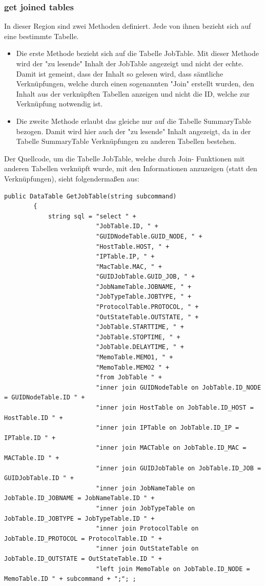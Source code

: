 \documentclass[12pt,a4paper]{report}
\begin{document}
\begin{onehalfspace}
\subsubsection{get joined tables}
In dieser Region sind zwei Methoden definiert. Jede von ihnen bezieht sich auf eine bestimmte Tabelle.
\begin{itemize}
\item Die erste Methode bezieht sich auf die Tabelle JobTable. Mit dieser Methode wird der "{}zu lesende"{} Inhalt der JobTable angezeigt und nicht der echte. Damit ist gemeint, dass der Inhalt so gelesen wird, dass sämtliche Verknüpfungen, welche durch einen sogenannten "{}Join"{} erstellt wurden, den Inhalt aus der verknüpften Tabellen anzeigen und nicht die ID, welche zur Verknüpfung notwendig ist.
\item Die zweite Methode erlaubt das gleiche nur auf die Tabelle SummaryTable bezogen. Damit wird hier auch der "{}zu lesende"{} Inhalt angezeigt, da in der Tabelle SummaryTable Verknüpfungen zu anderen Tabellen bestehen.
\end{itemize}
Der Quellcode, um die Tabelle JobTable, welche durch Join- Funktionen mit anderen Tabellen verknüpft wurde, mit den Informationen anzuzeigen (statt den Verknüpfungen), sieht folgendermaßen aus:
\begin{lstlisting}
public DataTable GetJobTable(string subcommand)
        {
            string sql = "select " +
                         "JobTable.ID, " +
                         "GUIDNodeTable.GUID_NODE, " +
                         "HostTable.HOST, " +
                         "IPTable.IP, " +
                         "MacTable.MAC, " +
                         "GUIDJobTable.GUID_JOB, " +
                         "JobNameTable.JOBNAME, " +
                         "JobTypeTable.JOBTYPE, " +
                         "ProtocolTable.PROTOCOL, " +
                         "OutStateTable.OUTSTATE, " +
                         "JobTable.STARTTIME, " +
                         "JobTable.STOPTIME, " +
                         "JobTable.DELAYTIME, " +
                         "MemoTable.MEMO1, " +
                         "MemoTable.MEMO2 " +
                         "from JobTable " +
                         "inner join GUIDNodeTable on JobTable.ID_NODE = GUIDNodeTable.ID " +
                         "inner join HostTable on JobTable.ID_HOST = HostTable.ID " +
                         "inner join IPTable on JobTable.ID_IP = IPTable.ID " +
                         "inner join MACTable on JobTable.ID_MAC = MACTable.ID " +
                         "inner join GUIDJobTable on JobTable.ID_JOB = GUIDJobTable.ID " +
                         "inner join JobNameTable on JobTable.ID_JOBNAME = JobNameTable.ID " +
                         "inner join JobTypeTable on JobTable.ID_JOBTYPE = JobTypeTable.ID " +
                         "inner join ProtocolTable on JobTable.ID_PROTOCOL = ProtocolTable.ID " +
                         "inner join OutStateTable on JobTable.ID_OUTSTATE = OutStateTable.ID " +
                         "left join MemoTable on JobTable.ID_NODE = MemoTable.ID " + subcommand + ";"; ;


\end{lstlisting}
\end{onehalfspace}
\end{document}
